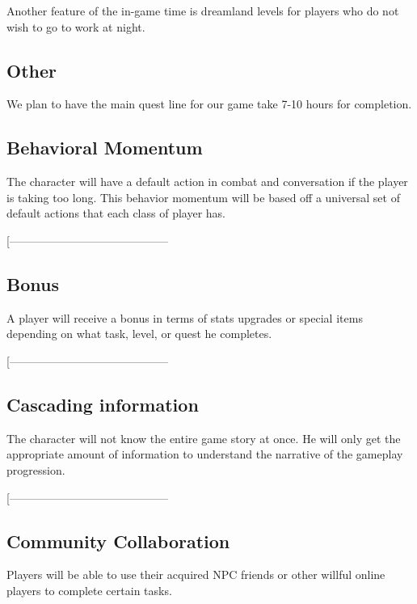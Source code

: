 \documentclass[9pt]{article}
\begin{document}
Another feature of the in-game time is dreamland levels for players who
do not wish to go to work at night. 

\subsection*{Other}
We plan to have the main quest line for our game take 7-10 hours for completion.














\newpage









\subsection*{Behavioral Momentum}
The character will have a default action in combat and conversation if the player is taking too long. This behavior momentum will be based off a universal set of default actions that each class of player has.

[------------------------------------------
\smallskip


\subsection*{Bonus}
A player will receive a bonus in terms of stats upgrades or special items depending on what task, level, or quest he completes.

[------------------------------------------
\smallskip


\subsection*{Cascading information}
The character will not know the entire game story at once. He will only get the appropriate amount of information to understand the narrative of the gameplay progression.

[------------------------------------------
\smallskip


\subsection*{Community Collaboration}
Players will be able to use their acquired NPC friends or other willful online players to complete certain tasks.
\end{document}
